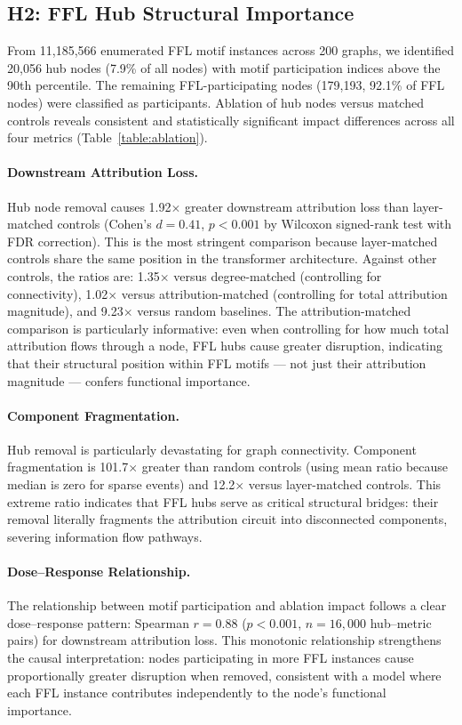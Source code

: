 \subsection{H2: FFL Hub Structural Importance}\label{sec:results_h2}

From 11,185,566 enumerated FFL motif instances across 200 graphs, we identified 20,056 hub nodes (7.9\% of all nodes) with motif participation indices above the 90th percentile. The remaining FFL-participating nodes (179,193, 92.1\% of FFL nodes) were classified as participants. Ablation of hub nodes versus matched controls reveals consistent and statistically significant impact differences across all four metrics (Table~\ref{table:ablation}).

\paragraph{Downstream Attribution Loss.}
Hub node removal causes 1.92$\times$ greater downstream attribution loss than layer-matched controls (Cohen's $d=0.41$, $p<0.001$ by Wilcoxon signed-rank test with FDR correction). This is the most stringent comparison because layer-matched controls share the same position in the transformer architecture. Against other controls, the ratios are: 1.35$\times$ versus degree-matched (controlling for connectivity), 1.02$\times$ versus attribution-matched (controlling for total attribution magnitude), and 9.23$\times$ versus random baselines. The attribution-matched comparison is particularly informative: even when controlling for how much total attribution flows through a node, FFL hubs cause greater disruption, indicating that their structural position within FFL motifs --- not just their attribution magnitude --- confers functional importance.

\paragraph{Component Fragmentation.}
Hub removal is particularly devastating for graph connectivity. Component fragmentation is 101.7$\times$ greater than random controls (using mean ratio because median is zero for sparse events) and 12.2$\times$ versus layer-matched controls. This extreme ratio indicates that FFL hubs serve as critical structural bridges: their removal literally fragments the attribution circuit into disconnected components, severing information flow pathways.

\paragraph{Dose--Response Relationship.}
The relationship between motif participation and ablation impact follows a clear dose--response pattern: Spearman $r=0.88$ ($p<0.001$, $n=16,000$ hub--metric pairs) for downstream attribution loss. This monotonic relationship strengthens the causal interpretation: nodes participating in more FFL instances cause proportionally greater disruption when removed, consistent with a model where each FFL instance contributes independently to the node's functional importance.

